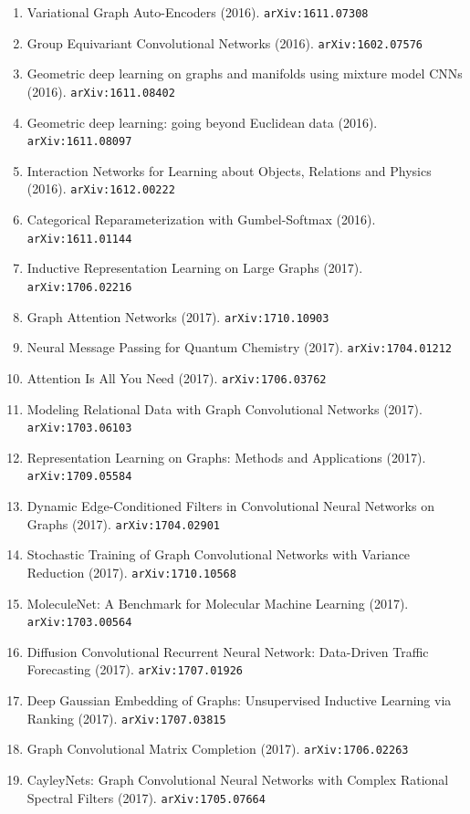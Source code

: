 \documentclass[11pt]{article}
\begin{document}
\begin{enumerate}
  \item Variational Graph Auto-Encoders (2016). \texttt{arXiv:1611.07308}
  \item Group Equivariant Convolutional Networks (2016). \texttt{arXiv:1602.07576}
  \item Geometric deep learning on graphs and manifolds using mixture model CNNs (2016). \texttt{arXiv:1611.08402}
  \item Geometric deep learning: going beyond Euclidean data (2016). \texttt{arXiv:1611.08097}
  \item Interaction Networks for Learning about Objects, Relations and Physics (2016). \texttt{arXiv:1612.00222}
  \item Categorical Reparameterization with Gumbel-Softmax (2016). \texttt{arXiv:1611.01144}
  \item Inductive Representation Learning on Large Graphs (2017). \texttt{arXiv:1706.02216}
  \item Graph Attention Networks (2017). \texttt{arXiv:1710.10903}
  \item Neural Message Passing for Quantum Chemistry (2017). \texttt{arXiv:1704.01212}
  \item Attention Is All You Need (2017). \texttt{arXiv:1706.03762}
  \item Modeling Relational Data with Graph Convolutional Networks (2017). \texttt{arXiv:1703.06103}
  \item Representation Learning on Graphs: Methods and Applications (2017). \texttt{arXiv:1709.05584}
  \item Dynamic Edge-Conditioned Filters in Convolutional Neural Networks on
  Graphs (2017). \texttt{arXiv:1704.02901}
  \item Stochastic Training of Graph Convolutional Networks with Variance
  Reduction (2017). \texttt{arXiv:1710.10568}
  \item MoleculeNet: A Benchmark for Molecular Machine Learning (2017). \texttt{arXiv:1703.00564}
  \item Diffusion Convolutional Recurrent Neural Network: Data-Driven Traffic
  Forecasting (2017). \texttt{arXiv:1707.01926}
  \item Deep Gaussian Embedding of Graphs: Unsupervised Inductive Learning via
  Ranking (2017). \texttt{arXiv:1707.03815}
  \item Graph Convolutional Matrix Completion (2017). \texttt{arXiv:1706.02263}
  \item CayleyNets: Graph Convolutional Neural Networks with Complex Rational
  Spectral Filters (2017). \texttt{arXiv:1705.07664}

\end{enumerate}
\end{document}
